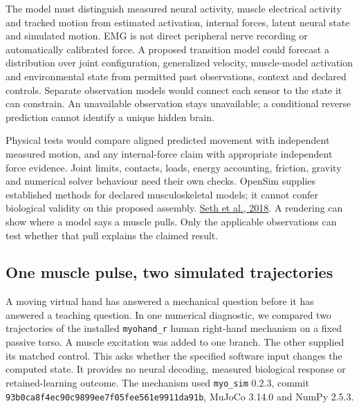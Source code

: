 The model must distinguish measured neural activity, muscle electrical activity and tracked motion from estimated activation, internal forces, latent neural state and simulated motion. EMG is not direct peripheral nerve recording or automatically calibrated force. A proposed transition model could forecast a distribution over joint configuration, generalized velocity, muscle-model activation and environmental state from permitted past observations, context and declared controls. Separate observation models would connect each sensor to the state it can constrain. An unavailable observation stays unavailable; a conditional reverse prediction cannot identify a unique hidden brain.

Physical tests would compare aligned predicted movement with independent measured motion, and any internal-force claim with appropriate independent force evidence. Joint limits, contacts, loads, energy accounting, friction, gravity and numerical solver behaviour need their own checks. OpenSim supplies established methods for declared musculoskeletal models; it cannot confer biological validity on this proposed assembly. \href{https://journals.plos.org/ploscompbiol/article?id=10.1371/journal.pcbi.1006223}{Seth et al., 2018}. A rendering can show where a model says a muscle pulls. Only the applicable observations can test whether that pull explains the claimed result.

\subsection{One muscle pulse, two simulated trajectories}

A moving virtual hand has answered a mechanical question before it has answered a teaching question. In one numerical diagnostic, we compared two trajectories of the installed \texttt{myohand\_r} human right-hand mechanism on a fixed passive torso. A muscle excitation was added to one branch. The other supplied its matched control. This asks whether the specified software input changes the computed state. It provides no neural decoding, measured biological response or retained-learning outcome. The mechanism used \texttt{myo\_sim} 0.2.3, commit \texttt{93b0ca8f4ec90c9899ee7f05fee561e9911da91b}, MuJoCo 3.14.0 and NumPy 2.5.3.\cite{myohandMyoSimPinned2026,myohandMuJoCo3140,mujoco2012,myohandNumericalRecord20261105}

